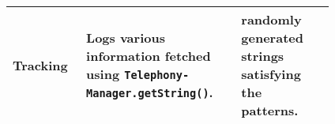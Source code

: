 \begin{table}[h]
{\begin{center}
\begin{tabular}{|>{\centering}m{0.15\linewidth}|m{0.4\linewidth}|m{0.26\linewidth}|}
                \hline
                Tracking & Logs various information fetched using \texttt{Telephony- Manager.getString()}. & randomly generated strings satisfying the patterns.  \\
                \hline
            \end{tabular}
    \end{center}
    }
    \label{tab:benchmarking_strategy}
\end{table}